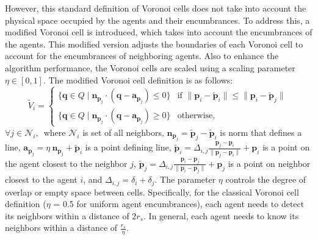         However, this standard definition of Voronoi cells does not take into account the physical space occupied by the agents and their encumbrances. 
        To address this, a modified Voronoi cell is introduced, which takes into account the encumbrances of the agents.
        This modified version adjusts the boundaries of each Voronoi cell to account for the encumbrances of neighboring agents.
        Also to enhance the algorithm performance, the Voronoi cells are scaled using a scaling parameter $\eta \in [0, 1]$.
        The modified Voronoi cell definition is as follows:
        \begin{equation}
            \label{eqn:voronoi_cell_account_encum}
            \tilde{V}_i = 
            \begin{cases}
                \{ \mathbf{q} \in Q \mid \mathbf{n}_{\mathbf{p}_j} \cdot (\mathbf{q} - \mathbf{a}_{\mathbf{p}_j}) \leq 0 \} & \text{if } \| \mathbf{p}_{i} - \tilde{\mathbf{p}}_{i} \| \leq \| \mathbf{p}_{i} - \tilde{\mathbf{p}}_{j} \| \\
                \{ \mathbf{q} \in Q \mid \mathbf{n}_{\mathbf{p}_j} \cdot (\mathbf{q} - \mathbf{a}_{\mathbf{p}_j}) \geq 0 \} & \text{otherwise,}
            \end{cases}
        \end{equation}
        $\forall j \in \mathcal{N}_i \text{, }$
        where $\mathcal{N}_i$ is set of all neighbors, $\mathbf{n}_{\mathbf{p}_j} = \tilde{\mathbf{p}}_{j} - \tilde{\mathbf{p}}_{i}$ is norm that defines a line, 
        $\mathbf{a}_{\mathbf{p}_{j}} = \eta \ \mathbf{n}_{\mathbf{p}_j} + \tilde{\mathbf{p}}_{i}$ is a point defining line,
        $\tilde{\mathbf{p}}_{i} = \Delta_{i,j}\frac{\mathbf{p}_{j} - \mathbf{p}_{i}}{\| \mathbf{p}_{j} - \mathbf{p}_{i} \|} + \mathbf{p}_i$ is a point on the agent closest to the neighbor $j$,
        $\tilde{\mathbf{p}}_{j} = \Delta_{i,j}\frac{\mathbf{p}_{i} - \mathbf{p}_{j}}{\| \mathbf{p}_{i} - \mathbf{p}_{j} \|} + \mathbf{p}_{j}$ is a point on neighbor closest to the agent $i$,
        and $\Delta_{i,j} = \delta_{i} + \delta_{j}$.
        The parameter $\eta$ controls the degree of overlap or empty space between cells.
        Specifically, for the classical Voronoi cell definition ($\eta$ = 0.5 for uniform agent encumbrances), each agent needs to detect its neighbors within a distance of $2r_{s}$.
        In general, each agent needs to know its neighbors within a distance of $\frac{r_s}{\eta}$.

